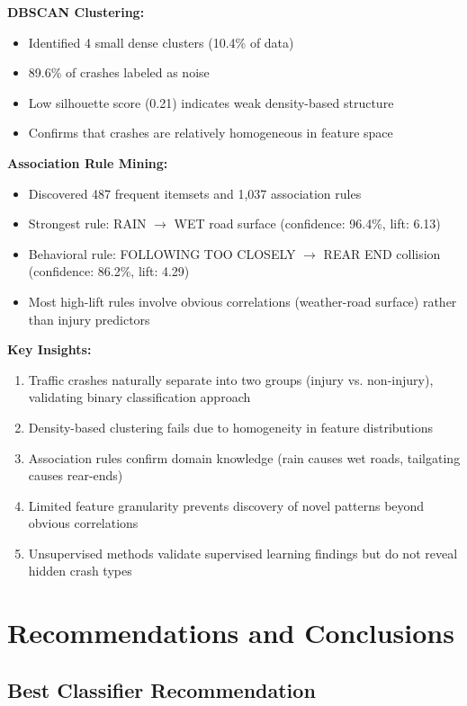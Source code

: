 \documentclass[12pt,man]{apa7}
\begin{document}
\textbf{DBSCAN Clustering:}
\begin{itemize}
    \item Identified 4 small dense clusters (10.4\% of data)
    \item 89.6\% of crashes labeled as noise
    \item Low silhouette score (0.21) indicates weak density-based structure
    \item Confirms that crashes are relatively homogeneous in feature space
\end{itemize}

\textbf{Association Rule Mining:}
\begin{itemize}
    \item Discovered 487 frequent itemsets and 1,037 association rules
    \item Strongest rule: RAIN $\rightarrow$ WET road surface (confidence: 96.4\%, lift: 6.13)
    \item Behavioral rule: FOLLOWING TOO CLOSELY $\rightarrow$ REAR END collision (confidence: 86.2\%, lift: 4.29)
    \item Most high-lift rules involve obvious correlations (weather-road surface) rather than injury predictors
\end{itemize}

\textbf{Key Insights:}
\begin{enumerate}
    \item Traffic crashes naturally separate into two groups (injury vs. non-injury), validating binary classification approach
    \item Density-based clustering fails due to homogeneity in feature distributions
    \item Association rules confirm domain knowledge (rain causes wet roads, tailgating causes rear-ends)
    \item Limited feature granularity prevents discovery of novel patterns beyond obvious correlations
    \item Unsupervised methods validate supervised learning findings but do not reveal hidden crash types
\end{enumerate}

\section{Recommendations and Conclusions}

\subsection{Best Classifier Recommendation}
\end{document}
